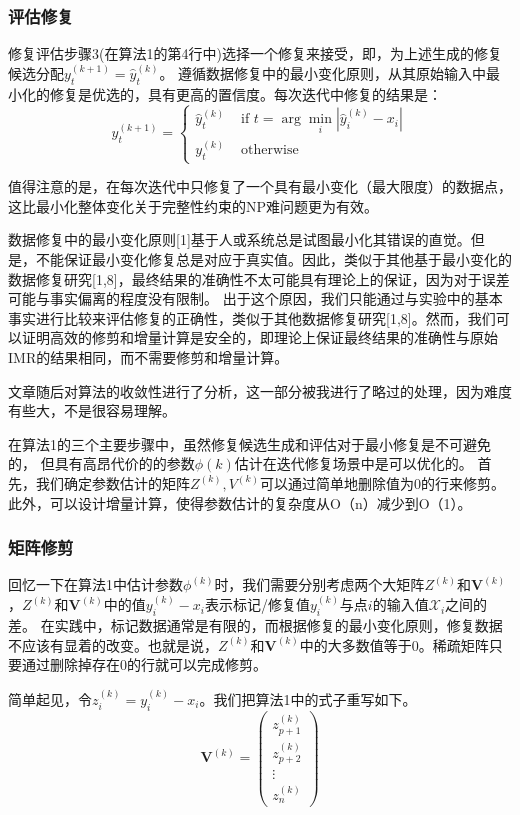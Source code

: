 \documentclass[12pt,a4paper]{article}
\begin{document}
\subsubsection{评估修复}
修复评估步骤3(在算法1的第4行中)选择一个修复来接受，即，为上述生成的修复候选分配$y_{t}^{(k+1)}=\hat{y}_{t}^{(k)}$。
遵循数据修复中的最小变化原则，从其原始输入中最小化的修复是优选的，具有更高的置信度。每次迭代中修复的结果是：
\begin{equation}
y_{t}^{(k+1)}=\left\{\begin{array}{ll}{\hat{y}_{t}^{(k)}} & {\text { if } t=\arg \min _{i}\left|\hat{y}_{i}^{(k)}-x_{i}\right|} \\ {y_{t}^{(k)}} & {\text { otherwise }}\end{array}\right. \end{equation}
\par
值得注意的是，在每次迭代中只修复了一个具有最小变化（最大限度）的数据点，这比最小化整体变化关于完整性约束的NP难问题更为有效。
\par
数据修复中的最小变化原则[1]基于人或系统总是试图最小化其错误的直觉。但是，不能保证最小变化修复总是对应于真实值。因此，类似于其他基于最小变化的数据修复研究[1,8]，最终结果的准确性不太可能具有理论上的保证，因为对于误差可能与事实偏离的程度没有限制。
出于这个原因，我们只能通过与实验中的基本事实进行比较来评估修复的正确性，类似于其他数据修复研究[1,8]。然而，我们可以证明高效的修剪和增量计算是安全的，即理论上保证最终结果的准确性与原始IMR的结果相同，而不需要修剪和增量计算。
\par
文章随后对算法的收敛性进行了分析，这一部分被我进行了略过的处理，因为难度有些大，不是很容易理解。
\par
在算法1的三个主要步骤中，虽然修复候选生成和评估对于最小修复是不可避免的，
但具有高昂代价的的参数$\phi(k)$估计在迭代修复场景中是可以优化的。
首先，我们确定参数估计的矩阵$Z^{(k)}, V^{(k)}$可以通过简单地删除值为0的行来修剪。此外，可以设计增量计算，使得参数估计的复杂度从O（n）减少到O（1）。
\subsubsection{矩阵修剪}
回忆一下在算法1中估计参数$\phi^{(k)}$时，我们需要分别考虑两个大矩阵$Z^{(k)}$和$\boldsymbol{V}^{(k)}$，$Z^{(k)}$和$\boldsymbol{V}^{(k)}$中的值$y_{i}^{(k)}-x_{i}$表示标记/修复值$y_{i}^{(k)}$与点$i$的输入值$\mathcal{X}_{i}$之间的差。
在实践中，标记数据通常是有限的，而根据修复的最小变化原则，修复数据不应该有显着的改变。也就是说，$Z^{(k)}$和$\boldsymbol{V}^{(k)}$中的大多数值等于0。稀疏矩阵只要通过删除掉存在0的行就可以完成修剪。
\par
简单起见，令$z_{i}^{(k)}=y_{i}^{(k)}-x_{i}$。我们把算法1中的式子重写如下。
\begin{equation}
\boldsymbol{V}^{(k)}=\left(\begin{array}{c}{z_{p+1}^{(k)}} \\ {z_{p+2}^{(k)}} \\ {\vdots} \\ {z_{n}^{(k)}}\end{array}\right)
\end{equation}
\end{document}
